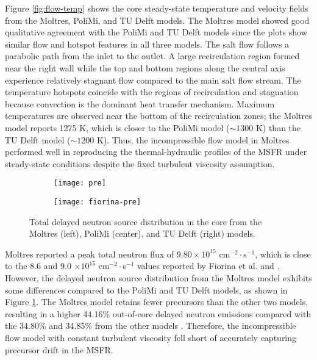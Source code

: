 Figure \ref{fig:flow-temp} shows the core steady-state temperature and velocity
fields from the Moltres, PoliMi, and TU Delft models. The Moltres
model showed
good qualitative agreement with the PoliMi and TU Delft models since the plots
show similar flow and hotspot features in all three models. The salt flow
follows a parabolic path from the inlet to the outlet. A large
recirculation region formed near the right wall while the top and bottom
regions along the central axis experience relatively stagnant flow compared to
the main salt flow stream. The temperature hotspots coincide with the regions of
recirculation and stagnation because convection is the dominant heat transfer
mechanism. Maximum temperatures are observed near the bottom of the
recirculation zones; the Moltres model reports 1275 K, which is closer to the
PoliMi model ($\sim1300$ K) than the TU Delft model ($\sim1200$ K). Thus, the
incompressible flow model in Moltres performed well in reproducing the
thermal-hydraulic profiles of the \gls{MSFR} under steady-state conditions
despite the fixed turbulent viscosity assumption.

\begin{figure}[b!]
    \centering
    \begin{subfigure}[t]{.30\textwidth}
        \centering
        \vspace{.9cm}
        \texttt{[image: pre]}
    \end{subfigure}
    \begin{subfigure}[t]{.69\textwidth}
        \centering
        \vspace{0pt}
        \texttt{[image: fiorina-pre]}
    \end{subfigure}
    \caption{Total delayed neutron source distribution in the core from the
    Moltres (left), PoliMi (center), and TU Delft (right) models.}
    \label{fig:pre}
\end{figure}

Moltres reported a peak total neutron flux of $9.80 \times 10^{15}$
cm$^{-2}\cdot$s$^{-1}$, which is close to the 8.6 and 9.0 $\times 10^{15}$
cm$^{-2}\cdot$s$^{-1}$ values reported by Fiorina et al.
\cite{fiorina_molten_2013} and \cite{aufiero_development_2014}. However, the
delayed neutron source distribution from the Moltres model exhibits some
differences compared to the PoliMi and TU Delft models, as shown in Figure
\ref{fig:pre}. The Moltres model retains fewer precursors than the other two
models, resulting in a higher 44.16\% out-of-core delayed neutron emissions
compared with the 34.80\% and 34.85\% from the other models
\cite{park_advancement_2020}. Therefore, the incompressible flow model with
constant turbulent viscosity fell short of accurately capturing precursor
drift in the \gls{MSFR}.

